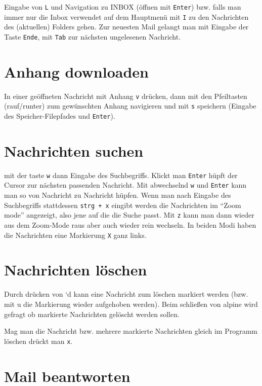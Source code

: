 \documentclass[]{book}
\begin{document}
Eingabe von \texttt{L} und Navigation zu INBOX (öffnen mit \texttt{Enter}) bzw. falls man immer nur die Inbox verwendet auf dem Hauptmenü mit \texttt{I} zu den Nachrichten des (aktuellen) Folders gehen. Zur neuesten Mail gelangt man mit Eingabe der Taste \texttt{Ende}, mit \texttt{Tab} zur nächsten ungelesenen Nachricht.

\hypertarget{anhang-downloaden}{%
\section{Anhang downloaden}\label{anhang-downloaden}}

In einer geöffneten Nachricht mit Anhang \texttt{v} drücken, dann mit den Pfeiltasten (rauf/runter) zum gewünschten Anhang navigieren und mit \texttt{s} speichern (Eingabe des Speicher-Filepfades und \texttt{Enter}).

\hypertarget{nachrichten-suchen}{%
\section{Nachrichten suchen}\label{nachrichten-suchen}}

mit der taste \texttt{w} dann Eingabe des Suchbegriffs. Klickt man \texttt{Enter} hüpft der Cursor zur nächsten passenden Nachricht. Mit abwechselnd \texttt{w} und \texttt{Enter} kann man so von Nachricht zu Nachricht hüpfen.
Wenn man nach Eingabe des Suchbegriffs stattdessen \texttt{strg\ +\ x} eingibt werden die Nachrichten im ``Zoom mode'' angezeigt, also jene auf die die Suche passt. Mit \texttt{z} kann man dann wieder aus dem Zoom-Mode raus aber auch wieder rein wechseln. In beiden Modi haben die Nachrichten eine Markierung \texttt{X} ganz links.

\hypertarget{nachrichten-loschen}{%
\section{Nachrichten löschen}\label{nachrichten-loschen}}

Durch drücken von `d kann eine Nachricht zum löschen markiert werden (bzw. mit u die Markierung wieder aufgehoben werden). Beim schließen von alpine wird gefragt ob markierte Nachrichten gelöscht werden sollen.

Mag man die Nachricht bzw. mehrere markierte Nachrichten gleich im Programm löschen drückt man \texttt{x}.

\hypertarget{mail-beantworten}{%
\section{Mail beantworten}\label{mail-beantworten}}
\end{document}
